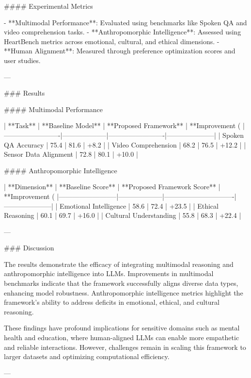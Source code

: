 #### Experimental Metrics

- **Multimodal Performance**: Evaluated using benchmarks like Spoken QA and video comprehension tasks.
- **Anthropomorphic Intelligence**: Assessed using HeartBench metrics across emotional, cultural, and ethical dimensions.
- **Human Alignment**: Measured through preference optimization scores and user studies.

---

### Results

#### Multimodal Performance

| **Task**               | **Baseline Model** | **Proposed Framework** | **Improvement (%
|-------------------------|--------------------|-------------------------|---------------------|
| Spoken QA Accuracy      | 75.4              | 81.6                   | +8.2               |
| Video Comprehension     | 68.2              | 76.5                   | +12.2              |
| Sensor Data Alignment   | 72.8              | 80.1                   | +10.0              |

#### Anthropomorphic Intelligence

| **Dimension**           | **Baseline Score** | **Proposed Framework Score** | **Improvement (%
|--------------------------|--------------------|-------------------------------|---------------------|
| Emotional Intelligence   | 58.6              | 72.4                          | +23.5              |
| Ethical Reasoning        | 60.1              | 69.7                          | +16.0              |
| Cultural Understanding   | 55.8              | 68.3                          | +22.4              |

---

### Discussion

The results demonstrate the efficacy of integrating multimodal reasoning and anthropomorphic intelligence into LLMs. Improvements in multimodal benchmarks indicate that the framework successfully aligns diverse data types, enhancing model robustness. Anthropomorphic intelligence metrics highlight the framework's ability to address deficits in emotional, ethical, and cultural reasoning.

These findings have profound implications for sensitive domains such as mental health and education, where human-aligned LLMs can enable more empathetic and reliable interactions. However, challenges remain in scaling this framework to larger datasets and optimizing computational efficiency.

---

